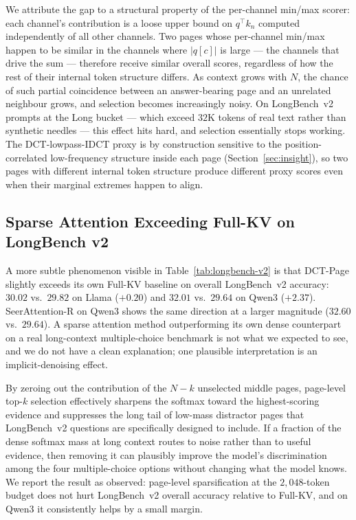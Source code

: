 We attribute the gap to a structural property of the per-channel
min/max scorer: each channel's contribution is a loose upper bound on
$q^\top k_n$ computed independently of all other channels.  Two pages
whose per-channel min/max happen to be similar in the channels where
$|q[c]|$ is large --- the channels that drive the sum --- therefore
receive similar overall scores, regardless of how the rest of their
internal token structure differs.  As context grows with $N$, the
chance of such partial coincidence between an answer-bearing page and
an unrelated neighbour grows, and selection becomes increasingly
noisy.  On LongBench~v2 prompts at the Long bucket --- which exceed
$32$K tokens of real text rather than synthetic needles --- this
effect hits hard, and selection essentially stops working.  The
DCT-lowpass-IDCT proxy is by construction sensitive to the
position-correlated low-frequency structure inside each page
(Section~\ref{sec:insight}), so two pages with different internal
token structure produce different proxy scores even when their
marginal extremes happen to align.

\subsection{Sparse Attention Exceeding Full-KV on LongBench v2}\label{sec:lbv2-surprise}

A more subtle phenomenon visible in Table~\ref{tab:longbench-v2} is
that DCT-Page slightly exceeds its own Full-KV baseline on overall
LongBench~v2 accuracy: $30.02$ vs.\ $29.82$ on Llama ($+0.20$) and
$32.01$ vs.\ $29.64$ on Qwen3 ($+2.37$).  SeerAttention-R on Qwen3
shows the same direction at a larger magnitude ($32.60$ vs.\
$29.64$).  A sparse attention method outperforming its own dense
counterpart on a real long-context multiple-choice benchmark is not
what we expected to see, and we do not have a clean explanation; one
plausible interpretation is an implicit-denoising effect.

By zeroing out the contribution of the $N - k$ unselected middle
pages, page-level top-$k$ selection effectively sharpens the softmax
toward the highest-scoring evidence and suppresses the long tail of
low-mass distractor pages that LongBench~v2 questions are
specifically designed to include.  If a fraction of the dense softmax
mass at long context routes to noise rather than to useful evidence,
then removing it can plausibly improve the model's discrimination
among the four multiple-choice options without changing what the
model knows.  We report the result as observed: page-level
sparsification at the $2{,}048$-token budget does not hurt
LongBench~v2 overall accuracy relative to Full-KV, and on Qwen3 it
consistently helps by a small margin.


